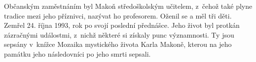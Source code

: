 Občanským zaměstnáním byl Makoň středoškolským učitelem, z~čehož také plyne
tradice mezi jeho příznivci, nazývat ho profesorem. Oženil se a měl tři děti.
Zemřel 24. října 1993, rok po svojí poslední přednášce. Jeho život byl protkán
zázračnými událostmi, z~nichž některé si získaly punc významnosti. Ty jsou
sepsány v~knížce Mozaika mystického života Karla Makoně\cite{kaliban2002mozaika}, kterou na
jeho památku jeho následovníci po jeho smrti sepsali.

%
%
%
%
%

